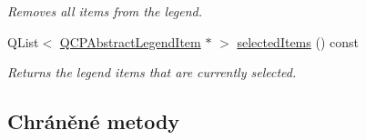 \begin{DoxyCompactItemize}
\begin{DoxyCompactList}\small\item\em Removes all items from the legend. \end{DoxyCompactList}\item 
Q\+List$<$ \hyperlink{classQCPAbstractLegendItem}{Q\+C\+P\+Abstract\+Legend\+Item} $\ast$ $>$ \hyperlink{classQCPLegend_ac93eaf236e911d67aa8b88942ef45c5e}{selected\+Items} () const 
\begin{DoxyCompactList}\small\item\em Returns the legend items that are currently selected. \end{DoxyCompactList}\end{DoxyCompactItemize}
\subsection*{Chráněné metody}
